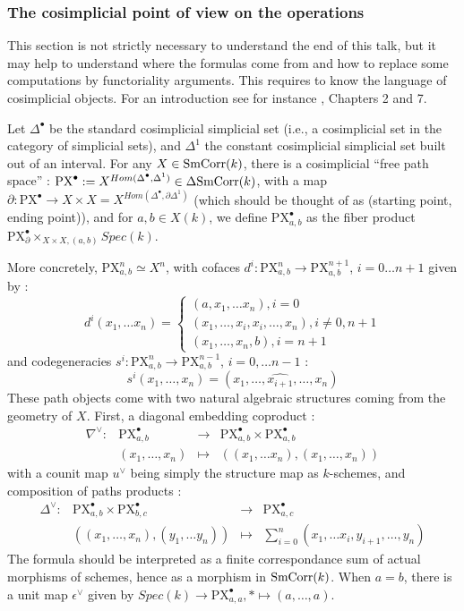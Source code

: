 \subsubsection{The cosimplicial point of view on the operations}
\label{cosimp}
This section is not strictly necessary to understand the end of this talk, but it may help to understand where the formulas come from and how to replace some computations by functoriality arguments. This requires to know the language of cosimplicial objects. For an introduction see for instance \cite{brbr}, Chapters 2 and 7.

Let $\Delta^\bullet$ be the standard cosimplicial simplicial set (i.e., a cosimplicial set in the category of simplicial sets), and $\Delta^1$ the constant cosimplicial simplicial set built out of an interval. For any $X\in \mathrm{SmCorr}(k)$, there is a cosimplicial ``free path space'' : $\mathrm{PX}^\bullet:=X^{Hom(\Delta^\bullet,\Delta^1)}\in \Delta \mathrm{SmCorr}(k)$, with a map  $\partial :\mathrm{PX}^\bullet\rightarrow X\times X=X^{Hom(\Delta^\bullet,\partial \Delta^1)}$ (which should be thought of as (starting point, ending point)), and for $a,b\in X(k)$, we define $\mathrm{PX}^\bullet_{a,b}$ as the fiber product $\mathrm{PX}^{\bullet} _{\partial}\times_{X\times X,(a,b)}Spec(k)$.

More concretely, $\mathrm{PX}^{n}_{a,b}\simeq X^n$, with cofaces $d^i:\mathrm{PX}^{n}_{a,b}\rightarrow\mathrm{PX}^{n+1}_{a,b}$, $i=0\ldots n+1$ given by :
\[
d^i(x_1,\ldots x_n)=\left\{\begin{array}{c}(a,x_1,\ldots x_n), i=0\\(x_1,\ldots,x_i,x_i,\ldots,x_n), i\neq 0,n+1\\(x_1,\ldots,x_n,b), i=n+1\end{array} \right.
\]
and codegeneracies $s^i:\mathrm{PX}^{n}_{a,b}\rightarrow\mathrm{PX}^{n-1}_{a,b}$, $i=0,\ldots n-1$ :
\[
s^i(x_1,\ldots,x_n)=(x_1,\ldots, \widehat{x_{i+1}},\ldots, x_n)
\]
These path objects come with two natural algebraic structures coming from the geometry of $X$. First, a diagonal embedding coproduct :
\[
\begin{array}{cccc} \nabla^{\vee}: &\mathrm{PX}^\bullet_{a,b} & \rightarrow &\mathrm{PX}^\bullet_{a,b}\times\mathrm{PX}^\bullet_{a,b}\\ & (x_1,\ldots,x_n) & \mapsto & ((x_1,\ldots x_n), (x_1,\ldots, x_n))\end{array}
\] 
with a counit map $u^\vee$ being simply the structure map as $k$-schemes, and composition of paths products :
\[
\begin{array}{cccc} \Delta^{\vee}: &\mathrm{PX}^\bullet_{a,b}\times\mathrm{PX}^\bullet_{b,c} & \rightarrow &\mathrm{PX}^\bullet_{a,c}\\ & ((x_1,\ldots,x_n),(y_1,\ldots y_n)) & \mapsto & \sum_{i=0}^{n}(x_1,\ldots x_i,y_{i+1},\ldots,y_n) 
\end{array}
\]
The formula should be interpreted as a finite correspondance sum of actual morphisms of schemes, hence as a morphism in $\mathrm{SmCorr}(k)$. When $a=b$, there is a unit map $\epsilon^\vee$ given by $Spec(k)\rightarrow\mathrm{PX}^\bullet_{a,a}, *\mapsto (a,\ldots,a)$.

